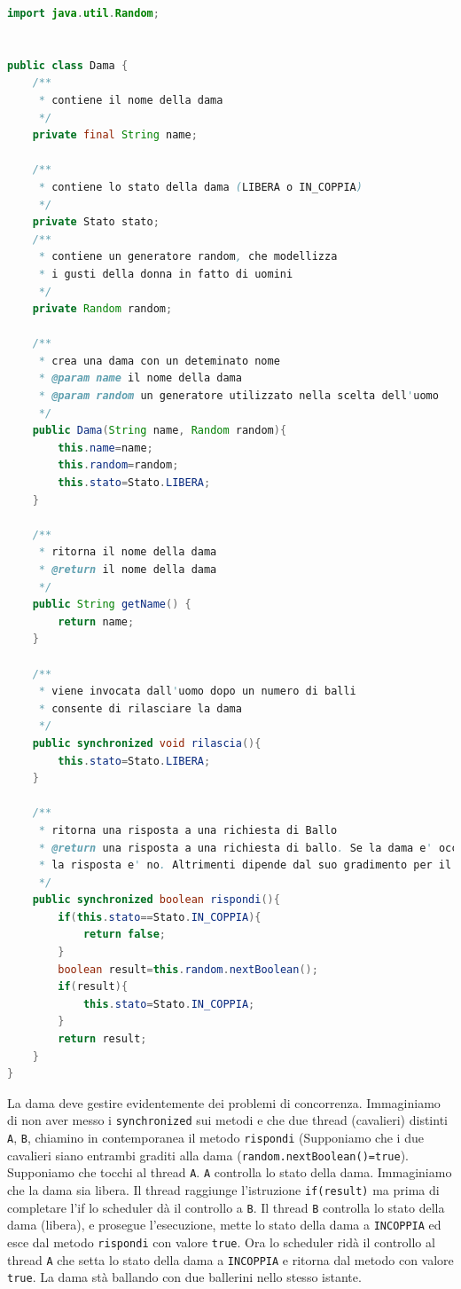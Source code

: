 \documentclass{article}
\begin{document}
\begin{lstlisting}[language=Java]
import java.util.Random;


public class Dama {
	/**
	 * contiene il nome della dama
	 */
	private final String name;
	
	/**
	 * contiene lo stato della dama (LIBERA o IN_COPPIA)
	 */
	private Stato stato;
	/**
	 * contiene un generatore random, che modellizza
	 * i gusti della donna in fatto di uomini
	 */
	private Random random;
	
	/**
	 * crea una dama con un deteminato nome
	 * @param name il nome della dama
	 * @param random un generatore utilizzato nella scelta dell'uomo
	 */
	public Dama(String name, Random random){
		this.name=name;
		this.random=random;
		this.stato=Stato.LIBERA;
	}

	/**
	 * ritorna il nome della dama
	 * @return il nome della dama
	 */
	public String getName() {
		return name;
	}
	
	/**
	 * viene invocata dall'uomo dopo un numero di balli
	 * consente di rilasciare la dama
	 */
	public synchronized void rilascia(){
		this.stato=Stato.LIBERA;
	}
	
	/**
	 * ritorna una risposta a una richiesta di Ballo
	 * @return una risposta a una richiesta di ballo. Se la dama e' occupata
	 * la risposta e' no. Altrimenti dipende dal suo gradimento per il cavaliere
	 */
	public synchronized boolean rispondi(){
		if(this.stato==Stato.IN_COPPIA){
			return false;
		}
		boolean result=this.random.nextBoolean();
		if(result){
			this.stato=Stato.IN_COPPIA;
		}
		return result;
	}
}
\end{lstlisting}
La dama deve gestire evidentemente dei problemi di concorrenza. Immaginiamo di non aver messo i \texttt{synchronized} sui metodi e che due thread (cavalieri) distinti \texttt{A}, \texttt{B}, chiamino in contemporanea il metodo \texttt{rispondi} (Supponiamo che i due cavalieri siano entrambi graditi alla dama (\texttt{random.nextBoolean()=true}). Supponiamo che tocchi al thread \texttt{A}. \texttt{A} controlla lo stato della dama. Immaginiamo che la dama sia libera. Il thread raggiunge l'istruzione \texttt{if(result)} ma prima di completare l'if lo scheduler d\`a il controllo a \texttt{B}. Il thread \texttt{B} controlla lo stato della dama (libera), e prosegue l'esecuzione, mette lo stato della dama a \texttt{INCOPPIA} ed esce dal metodo \texttt{rispondi} con valore \texttt{true}. Ora lo scheduler rid\`a il controllo al thread \texttt{A} che setta lo stato della dama a \texttt{INCOPPIA} e ritorna dal metodo con valore \texttt{true}. La dama st\`a ballando con due ballerini nello stesso istante.
\end{document}
